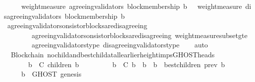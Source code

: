 \begin{isabellebody}
\ \ \ {\isasymlongrightarrow}\ \ weight{\isacharunderscore}measure\ {\isacharparenleft}agreeing{\isacharunderscore}validators\ {\isacharparenleft}block{\isacharunderscore}membership\ b{}{\isacharcomma}\ {\isasymsigma}{\isacharparenright}{\isacharparenright}\ {\isasymle}\ weight{\isacharunderscore}measure\ {\isacharparenleft}disagreeing{\isacharunderscore}validators\ {\isacharparenleft}block{\isacharunderscore}membership\ b{}{\isacharcomma}\ {\isasymsigma}{\isacharparenright}{\isacharparenright}{\isachardoublequoteclose}\isanewline
%
\isadelimproof
\ \ %
\endisadelimproof
%
\isatagproof
{}\isamarkupfalse%
\ agreeing{\isacharunderscore}validators{\isacharunderscore}on{\isacharunderscore}sistor{\isacharunderscore}blocks{\isacharunderscore}are{\isacharunderscore}disagreeing\isanewline
\ \ \ \ \ \ \ \ agreeing{\isacharunderscore}validators{\isacharunderscore}on{\isacharunderscore}sistor{\isacharunderscore}blocks{\isacharunderscore}are{\isacharunderscore}disagreeing\ weight{\isacharunderscore}measure{\isacharunderscore}subset{\isacharunderscore}gte\isanewline
\ \ \ \ \ \ \ \ agreeing{\isacharunderscore}validators{\isacharunderscore}type\ disagreeing{\isacharunderscore}validators{\isacharunderscore}type\isanewline
\ \ \isamarkupfalse%
\ auto%
\endisatagproof
{\isafoldproof}%
%
\isadelimproof
\isanewline
%
\endisadelimproof
\isanewline
{}\isamarkupfalse%
\ {\isacharparenleft}\ Blockchain{\isacharparenright}\ no{\isacharunderscore}child{\isacharunderscore}and{\isacharunderscore}best{\isacharunderscore}child{\isacharunderscore}at{\isacharunderscore}all{\isacharunderscore}earlier{\isacharunderscore}height{\isacharunderscore}imps{\isacharunderscore}GHOST{\isacharunderscore}heads\ {\isacharcolon}\isanewline
\ \ {\isachardoublequoteopen}{\isasymforall}\ {\isasymsigma}\ {\isasymin}\ {\isasymSigma}{\isachardot}\ {\isasymforall}\ b\ {\isasymin}\ C{\isachardot}\ children\ {\isacharparenleft}b{\isacharcomma}\ {\isasymsigma}{\isacharparenright}\ {\isacharequal}\ {\isasymemptyset}\ {\isasymand}\isanewline
\ \ \ \ {\isacharparenleft}{\isasymforall}\ b{\isacharprime}\ {\isasymin}\ C{\isachardot}\ b{\isacharprime}\ {\isasymdownharpoonright}\ b\ {\isasymlongrightarrow}\ b{\isacharprime}\ {\isasymin}\ best{\isacharunderscore}children\ {\isacharparenleft}prev\ b{\isacharprime}{\isacharcomma}\ {\isasymsigma}{\isacharparenright}{\isacharparenright}\isanewline
\ \ \ \ {\isasymlongrightarrow}\ b\ {\isasymin}\ GHOST\ {\isacharparenleft}{\isacharbraceleft}genesis{\isacharbraceright}{\isacharcomma}\ {\isasymsigma}{\isacharparenright}{\isachardoublequoteclose}\isanewline

\end{isabellebody}
